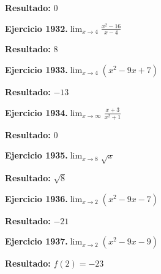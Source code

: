 \documentclass[10pt,a4paper]{article}
\begin{document}
\begin{solbox}
\textbf{Resultado:} \(\displaystyle 0\)
\end{solbox}

\begin{ejbox}
\textbf{Ejercicio 1932.}\quad $\lim_{x\to 4} \frac{x^2-16}{x-4}$
\end{ejbox}

\begin{solbox}
\textbf{Resultado:} \(\displaystyle 8\)
\end{solbox}

\newpage
\begin{ejbox}
\textbf{Ejercicio 1933.}\quad $\lim_{x\to 4} (x^2 -9x +7)$
\end{ejbox}

\begin{solbox}
\textbf{Resultado:} \(\displaystyle -13\)
\end{solbox}

\begin{ejbox}
\textbf{Ejercicio 1934.}\quad $\lim_{x\to \infty} \frac{x + 3}{x^2 + 1}$
\end{ejbox}

\begin{solbox}
\textbf{Resultado:} \(\displaystyle 0\)
\end{solbox}

\begin{ejbox}
\textbf{Ejercicio 1935.}\quad $\lim_{x\to 8} \sqrt{x}$
\end{ejbox}

\begin{solbox}
\textbf{Resultado:} \(\displaystyle \sqrt{8}\)
\end{solbox}

\newpage
\begin{ejbox}
\textbf{Ejercicio 1936.}\quad $\lim_{x\to 2} (x^2 -9x -7)$
\end{ejbox}

\begin{solbox}
\textbf{Resultado:} \(\displaystyle -21\)
\end{solbox}

\begin{ejbox}
\textbf{Ejercicio 1937.}\quad $\lim_{x\to 2} (x^2 -9x -9)$
\end{ejbox}

\begin{solbox}
\textbf{Resultado:} \(\displaystyle f(2) = -23\)
\end{solbox}
\end{document}
